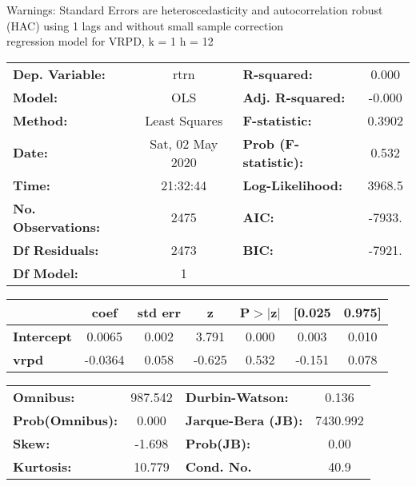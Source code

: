 Warnings: \newline
 [1] Standard Errors are heteroscedasticity and autocorrelation robust (HAC) using 1 lags and without small sample correction\\ 

regression model for VRPD, k = 1 h = 12\begin{center}
\begin{tabular}{lclc}
\toprule
\textbf{Dep. Variable:}    &       rtrn       & \textbf{  R-squared:         } &     0.000   \\
\textbf{Model:}            &       OLS        & \textbf{  Adj. R-squared:    } &    -0.000   \\
\textbf{Method:}           &  Least Squares   & \textbf{  F-statistic:       } &    0.3902   \\
\textbf{Date:}             & Sat, 02 May 2020 & \textbf{  Prob (F-statistic):} &    0.532    \\
\textbf{Time:}             &     21:32:44     & \textbf{  Log-Likelihood:    } &    3968.5   \\
\textbf{No. Observations:} &        2475      & \textbf{  AIC:               } &    -7933.   \\
\textbf{Df Residuals:}     &        2473      & \textbf{  BIC:               } &    -7921.   \\
\textbf{Df Model:}         &           1      & \textbf{                     } &             \\
\bottomrule
\end{tabular}
\begin{tabular}{lcccccc}
                   & \textbf{coef} & \textbf{std err} & \textbf{z} & \textbf{P$> |$z$|$} & \textbf{[0.025} & \textbf{0.975]}  \\
\midrule
\textbf{Intercept} &       0.0065  &        0.002     &     3.791  &         0.000        &        0.003    &        0.010     \\
\textbf{vrpd}      &      -0.0364  &        0.058     &    -0.625  &         0.532        &       -0.151    &        0.078     \\
\bottomrule
\end{tabular}
\begin{tabular}{lclc}
\textbf{Omnibus:}       & 987.542 & \textbf{  Durbin-Watson:     } &    0.136  \\
\textbf{Prob(Omnibus):} &   0.000 & \textbf{  Jarque-Bera (JB):  } & 7430.992  \\
\textbf{Skew:}          &  -1.698 & \textbf{  Prob(JB):          } &     0.00  \\
\textbf{Kurtosis:}      &  10.779 & \textbf{  Cond. No.          } &     40.9  \\
\bottomrule
\end{tabular}
\end{center}

